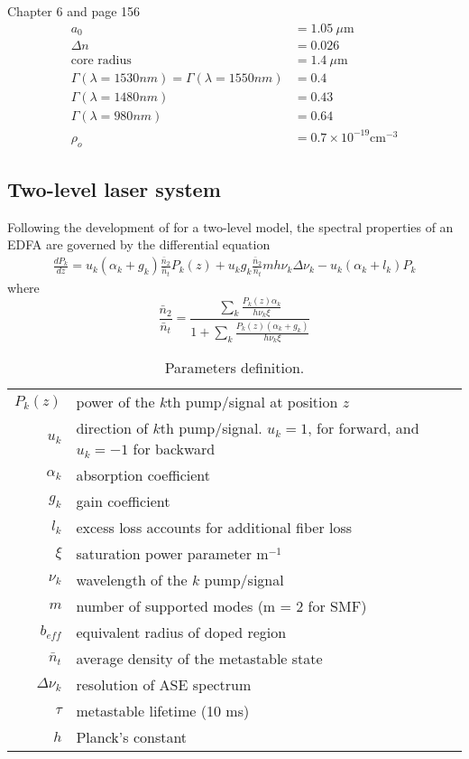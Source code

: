 \documentclass[a4paper]{article}
\begin{document}
Chapter 6 and page 156 \cite{edfa_becker}
\begin{align}
	a_0 &= 1.05~\mu\mathrm{m} \\
	\Delta n &= 0.026 \\
	\text{core radius} &= 1.4~\mu\mathrm{m} \\
	\Gamma(\lambda = 1530 nm) = \Gamma(\lambda = 1550 nm) &= 0.4 \\
	\Gamma(\lambda = 1480 nm) &= 0.43 \\
	\Gamma(\lambda = 980 nm) &= 0.64 \\
	\rho_o &= 0.7\times 10^{-19}\text{cm}^{-3}
\end{align}


\newpage
\subsection{Two-level laser system}
Following the development of \cite{Giles1991} for a two-level model, the spectral properties of an EDFA are governed by the differential equation
\begin{align}
	\frac{dP_k}{dz} = u_k(\alpha_k + g_k)\frac{\bar{n}_2}{\bar{n}_t}P_k(z) + u_kg_k\frac{\bar{n}_2}{\bar{n}_t}mh\nu_k\Delta\nu_k - u_k(\alpha_k + l_k)P_k
\end{align}
where
\begin{equation}
	\frac{\bar{n}_2}{\bar{n}_t} = \frac{\sum_k \frac{P_k(z)\alpha_k}{h\nu_k\xi}}{1 + \sum_k \frac{P_k(z)(\alpha_k + g_k)}{h\nu_k\xi}}
\end{equation}

\begin{table}[h]
	\caption{Parameters definition.}
	\label{tab:param}
	\centering
	\begin{tabular}{r|l}
		\hline
		$P_k(z)$ & power of the $k$th pump/signal at position $z$ \\
		$u_k$ & direction of $k$th pump/signal. $u_k = 1$, for forward, and $u_k = -1$ for backward \\
		$\alpha_k$ & absorption coefficient \\
		$g_k$ & gain coefficient \\
		$l_k$ & excess loss accounts for additional fiber loss \\
		$\xi$ & saturation power parameter $\mathrm{m}^{-1}$ \\
		$\nu_k$ & wavelength of the $k$ pump/signal \\
		$m$ & number of supported modes (m = 2 for SMF)\\
		$b_{eff}$ & equivalent radius of doped region \\
		$\bar{n}_t$ & average density of the metastable state \\
		$\Delta\nu_k$ & resolution of ASE spectrum \\
		$\tau$ & metastable lifetime (10 ms) \\
		$h$ & Planck's constant \\
		\hline
	\end{tabular}
\end{table}
\end{document}

